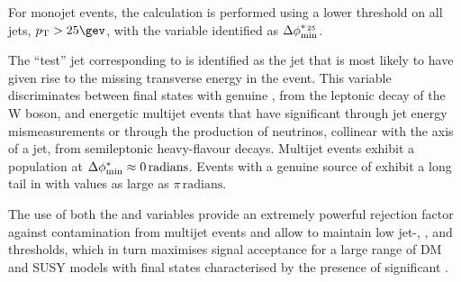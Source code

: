 For monojet events, the calculation is performed using a lower \Pt
threshold on all jets, $\Pt > 25\gev$, with the variable identified as
$\mbox{$\Delta\phi^{*_{\, 25}}_{\rm min}$}$.

The ``test'' jet corresponding to \bdphi is identified as the jet that
is most likely to have given rise to the missing transverse energy in
the event. This variable discriminates between final states with
genuine \ptvecmiss, \eg from the leptonic decay of the W boson, and
energetic multijet events that have significant \ptvecmiss through jet
energy mismeasurements or through the production of neutrinos,
collinear with the axis of a jet, from semileptonic heavy-flavour
decays. Multijet events exhibit a population at $\mbox{$\Delta\phi^{*}_{\rm min}$} \approx
0\,\mathrm{radians}$. Events with a genuine source of \ptvecmiss
exhibit a long tail in \bdphi with values as large as
$\pi\,\mathrm{radians}$.

The use of both the \bdphi and \alphat variables provide an extremely
powerful rejection factor against contamination from multijet events
and allow to maintain low jet-\PT, \HT, and \mht thresholds, which in
turn maximises signal acceptance for a large range of DM and SUSY
models with final states characterised by the presence of significant
\met.

